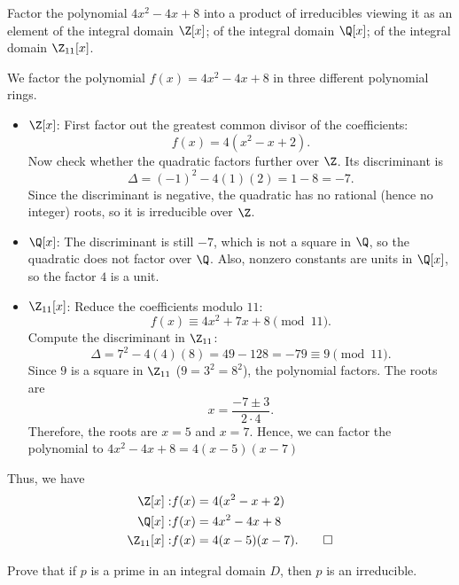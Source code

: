 \begin{problem}[34.10]
  Factor the polynomial $4x^2 - 4x + 8$ into a product of irreducibles viewing it as an element of the integral domain $\Z[x]$; of the integral domain $\Q[x]$; of the integral domain $\Z_{11}[x]$.
\end{problem}

\begin{solution}
  We factor the polynomial $f(x) = 4x^2 - 4x + 8$ in three different polynomial rings.

  \begin{itemize}
    \item $\Z[x]$: First factor out the greatest common divisor of the coefficients:
      \[%
        f(x) = 4(x^2 - x + 2)
      .\]%
      Now check whether the quadratic factors further over $\Z$. Its discriminant is
      \[%
        \Delta = (-1)^2 - 4(1)(2) = 1 - 8 = -7
      .\]%
      Since the discriminant is negative, the quadratic has no rational (hence no integer) roots, so it is irreducible over $\Z$.
    \item $\Q[x]$: The discriminant is still $-7$, which is not a square in $\Q$, so the quadratic does not factor over $\Q$. Also, nonzero constants are units in $\Q[x]$, so the factor $4$ is a unit.
    \item $\Z_{11}[x]$: Reduce the coefficients modulo $11$:
      \[%
        f(x) \equiv 4x^2 + 7x + 8 \pmod{11}
      .\]%
      Compute the discriminant in $\Z_{11}$:
      \[%
        \Delta = 7^2 - 4(4)(8) = 49 - 128 = -79 \equiv 9 \pmod{11}
      .\]%
      Since $9$ is a square in $\Z_{11}$ ($9 = 3^2 = 8^2$), the polynomial factors. The roots are
      \[%
        x = \frac{-7 \pm 3}{2 \cdot 4}
      .\]%
      Therefore, the roots are $x = 5$ and $x = 7$. Hence, we can factor the polynomial to $4x^2 - 4x + 8 = 4(x - 5)(x - 7)$
  \end{itemize}
  Thus, we have
  \begin{align*}
    \Z[x]:& f(x) = 4(x^2 - x + 2) \\
    \Q[x]:& f(x) = 4x^2 - 4x + 8 \\
    \Z_{11}[x]:& f(x) = 4(x-5)(x-7)
  .\qedhere\end{align*}
\end{solution}

\begin{problem}[34.25]
  Prove that if $p$ is a prime in an integral domain $D$, then $p$ is an irreducible.
\end{problem}

